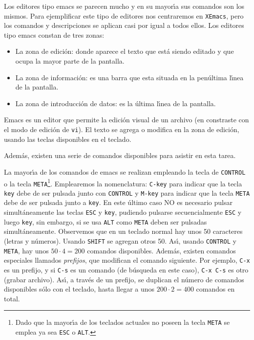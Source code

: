 Los editores tipo emacs se parecen mucho y en su mayor\'{\i}a sus comandos
son los mismos. Para ejemplificar este tipo de editores nos
centraremos en \verb+XEmacs+, pero los comandos y descripciones se aplican
casi por igual a todos ellos. Los editores tipo emacs constan de tres zonas:
\begin{itemize}
  
\item La zona de edici{\'o}n: donde aparece el texto que est{\'a} siendo
  editado y que ocupa la mayor parte de la pantalla.
  
\item La zona de informaci{\'o}n: es una barra que esta situada en la
  pen{\'u}ltima l{\'\i}nea de la pantalla.
  
\item La zona de introducci{\'o}n de datos: es la {\'u}ltima l{\'\i}nea de la
  pantalla.
\end {itemize}

Emacs es un editor que permite la edici{\'o}n visual de un archivo (en
constraste con el modo de edici{\'o}n de \verb+vi+). 
El texto se agrega o modifica en la zona de edici\'on, usando las
teclas disponibles en el teclado. 

Adem\'as, existen una serie de
comandos disponibles para asistir en esta tarea.

La mayor{\'\i}a de los comandos
de emacs se realizan empleando la tecla de \verb+CONTROL+ o la tecla
\verb+META+\footnote{Dado que la mayor{\'\i}a de los teclados actuales no
  poseen la tecla {\tt META} se emplea ya sea {\tt ESC} o {\tt ALT}.}.
Emplearemos la nomenclatura: \verb+C-key+ para indicar que la tecla
\verb+key+ debe de ser pulsada junto con \verb+CONTROL+ y \verb+M-key+
para indicar que la tecla \verb+META+ debe de ser pulsada junto a
\verb+key+. En este {\'u}ltimo caso NO es necesario pulsar simult{\'a}neamente
las teclas \verb+ESC+ y \verb+key+, pudiendo pulsarse secuencialmente
\verb+ESC+ y luego \verb+key+, sin embargo, si se usa \verb+ALT+ como
\verb+META+ deben ser pulsadas simult\'aneamente.  Observemos que
en un teclado normal hay unos 50 caracteres (letras y n\'umeros). Usando 
\verb+SHIFT+ se agregan otros 50. As\'{\i}, usando \verb+CONTROL+ y
\verb+META+, hay unos $50\cdot 4 = 200$ comandos
disponibles. Adem\'as, existen comandos especiales llamados {\it
  prefijos}, que modifican el comando siguiente. Por ejemplo, 
\verb+C-x+ es un prefijo, y si \verb+C-s+ es un comando (de b\'usqueda
en este caso), \verb+C-x C-s+ es otro (grabar archivo). As\'{\i}, a
trav\'es de un prefijo, se duplican el n\'umero de comandos
disponibles s\'olo con el teclado, hasta llegar a unos $200\cdot 2 =
400$ comandos en total.

